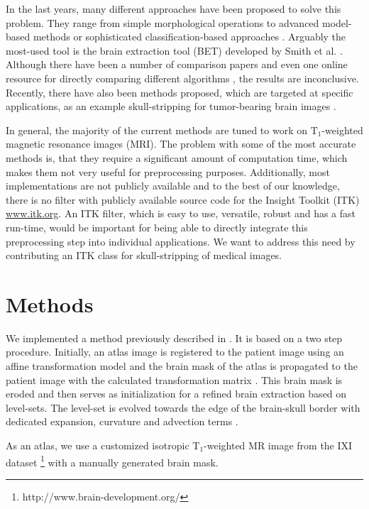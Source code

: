 \documentclass{InsightArticle}
\begin{document}
In the last years, many different approaches have been proposed to solve this problem. They range from simple morphological operations to advanced model-based methods or sophisticated classification-based approaches \cite{Carass2011,Eskildsen2011,Hahn2000,Iglesias2011,Segonne2004,Sadananthan2010,Sandor1997,Shi2011,Smith2002a,Wang2011}. Arguably the most-used tool is the brain extraction tool (BET) developed by Smith et al. \cite{Smith2002a}. Although there have been a number of comparison papers \cite{Fennema-Notestine2006,Hartley2006,Lee2003} and even one online resource for directly comparing different algorithms \cite{Shattuck2009}, the results are inconclusive. Recently, there have also been methods proposed, which are targeted at specific applications, as an example skull-stripping for tumor-bearing brain images \cite{Speier2011,Bauer2011c}.

In general, the majority of the current methods are tuned to work on $\mathrm{T_1}$-weighted magnetic resonance images (MRI). The problem with some of the most accurate methods is, that they require a significant amount of computation time, which makes them not very useful for preprocessing purposes. Additionally, most implementations are not publicly available and to the best of our knowledge, there is no filter with publicly available source code for the Insight Toolkit (ITK) \cite{Ibanez2003} \url{www.itk.org}. An ITK filter, which is easy to use, versatile, robust and has a fast run-time, would be important for being able to directly integrate this preprocessing step into individual applications. We want to address this need by contributing an ITK class for skull-stripping of medical images.

\section{Methods}

We implemented a method previously described in \cite{Bauer2011c}. It is based on a two step procedure. Initially, an atlas image is registered to the patient image using an affine transformation model and the brain mask of the atlas is propagated to the patient image with the calculated transformation matrix \cite{Zitova2003}. This brain mask is eroded and then serves as initialization for a refined brain extraction based on level-sets. The level-set is evolved towards the edge of the brain-skull border with dedicated expansion, curvature and advection terms \cite{Tsai2003}.

As an atlas, we use a customized isotropic $\mathrm{T_1}$-weighted MR image from the IXI dataset \footnote{http://www.brain-development.org/} with a manually generated brain mask.
\end{document}
